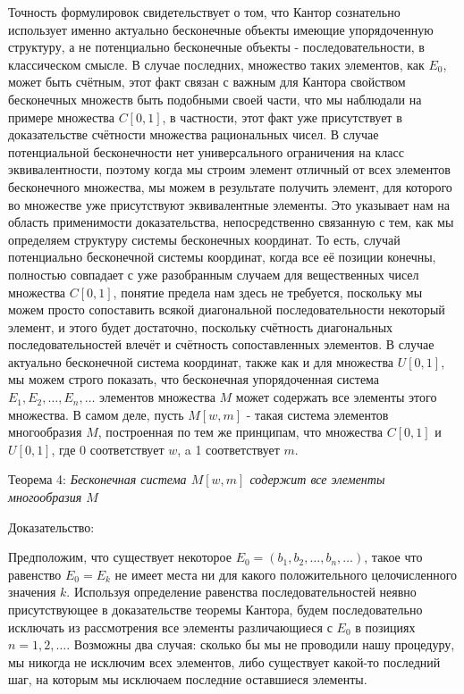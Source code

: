 \documentclass[12pt]{article}
\begin{document}
Точность формулировок свидетельствует о том, что Кантор сознательно использует именно актуально бесконечные объекты имеющие упорядоченную структуру, а не потенциально бесконечные объекты - последовательности, в классическом смысле. В случае последних, множество таких элементов, как $E_0$, может быть счётным, этот факт связан с важным для Кантора свойством бесконечных множеств быть подобными своей части, что мы наблюдали на примере множества $C[0, 1]$, в частности, этот факт уже присутствует в доказательстве счётности множества рациональных чисел. В случае потенциальной бесконечности нет универсального ограничения на класс эквивалентности, поэтому когда мы строим элемент отличный от всех элементов бесконечного множества, мы можем в результате получить элемент, для которого во множестве уже присутствуют эквивалентные элементы. Это указывает нам на область применимости доказательства, непосредственно связанную с тем, как мы определяем структуру системы бесконечных координат. То есть, случай потенциально бесконечной системы координат, когда все её позиции конечны, полностью совпадает с уже разобранным случаем для вещественных чисел множества $C[0, 1]$, понятие предела нам здесь не требуется, поскольку мы можем просто сопоставить всякой диагональной последовательности некоторый элемент, и этого будет достаточно, поскольку счётность диагональных последовательностей влечёт и счётность сопоставленных элементов. В случае актуально бесконечной система координат, также как и для множества $U[0, 1]$, мы можем строго показать, что бесконечная упорядоченная система $E_1, E_2, \dots, E_n, \dots$ элементов множества $M$ может содержать все элементы этого множества. В самом деле, пусть $M[w, m]$ - такая система элементов многообразия $M$, построенная по тем же принципам, что множества $C[0, 1]$ и $U[0, 1]$, где 0 соответствует $w$, a 1 соответствует $m$.

Теорема 4: {\sl Бесконечная система $M[w, m]$ содержит все элементы многообразия $M$}

Доказательство:

Предположим, что существует некоторое $E_0 = (b_1, b_2, \dots, b_n, \dots)$, такое что равенство $E_0 = E_k$ не имеет места ни для какого положительного целочисленного значения $k$. Используя определение равенства последовательностей неявно присутствующее в доказательстве теоремы Кантора, будем последовательно исключать из рассмотрения все элементы различающиеся с $E_0$ в позициях $n = 1, 2, \dots$. Возможны два случая: сколько бы мы не проводили нашу процедуру, мы никогда не исключим всех элементов, либо существует какой-то последний шаг, на которым мы исключаем последние оставшиеся элементы.
\end{document}
